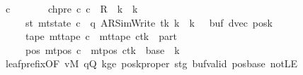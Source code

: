 \begin{isabellebody}
\ c{}\ \isanewline
\ \ \ \ \ \ ch{\isacharunderscore}{\kern0pt}pre{\isacharcolon}{\kern0pt}\ {\isachardoublequoteopen}{\isacharparenleft}{\kern0pt}c{\isacharprime}{\kern0pt}{\isacharcomma}{\kern0pt}\ c{}{\isacharparenright}{\kern0pt}\ {\isasymin}\ {\isacharquery}{\kern0pt}R\ {\isacharcircum}{\kern0pt}{\isacharcircum}{\kern0pt}\ {\isacharparenleft}{\kern0pt}{\isacharquery}{\kern0pt}k\ {\isacharplus}{\kern0pt}\ {\isacharparenleft}{\kern0pt}{\isacharquery}{\kern0pt}k\ {\isacharminus}{\kern0pt}\ {}{\isacharparenright}{\kern0pt}{\isacharparenright}{\kern0pt}{\isachardoublequoteclose}\isanewline
\ \ \ \ \ st{}{\isacharcolon}{\kern0pt}\ {\isachardoublequoteopen}mt{\isacharunderscore}{\kern0pt}state\ c{}\ {\isacharequal}{\kern0pt}\ {\isacharparenleft}{\kern0pt}q{\isacharcomma}{\kern0pt}\ AR{\isacharunderscore}{\kern0pt}SimWrite{\isacharcomma}{\kern0pt}\ tk{\isacharcomma}{\kern0pt}\ {\isacharquery}{\kern0pt}k\ {\isacharplus}{\kern0pt}\ {\isacharparenleft}{\kern0pt}{\isacharquery}{\kern0pt}k\ {\isacharminus}{\kern0pt}\ {}{\isacharparenright}{\kern0pt}{\isacharcomma}{\kern0pt}\ buf{\isacharcomma}{\kern0pt}\ dvec{\isacharcomma}{\kern0pt}\ posk{\isacharparenright}{\kern0pt}{\isachardoublequoteclose}\isanewline
\ \ \ \ \ tape{}{\isacharcolon}{\kern0pt}\ {\isachardoublequoteopen}mt{\isacharunderscore}{\kern0pt}tape\ c{}\ {\isacharequal}{\kern0pt}\ {\isacharparenleft}{\kern0pt}mt{\isacharunderscore}{\kern0pt}tape\ c{\isacharprime}{\kern0pt}{\isacharparenright}{\kern0pt}{\isacharparenleft}{\kern0pt}tk\ {\isacharcolon}{\kern0pt}{\isacharequal}{\kern0pt}\ {\isacharquery}{\kern0pt}part{\isacharparenright}{\kern0pt}{\isachardoublequoteclose}\isanewline
\ \ \ \ \ pos{}{\isacharcolon}{\kern0pt}\ {\isachardoublequoteopen}mt{\isacharunderscore}{\kern0pt}pos\ c{}\ {\isacharequal}{\kern0pt}\ {\isacharparenleft}{\kern0pt}mt{\isacharunderscore}{\kern0pt}pos\ c{\isacharprime}{\kern0pt}{\isacharparenright}{\kern0pt}{\isacharparenleft}{\kern0pt}tk\ {\isacharcolon}{\kern0pt}{\isacharequal}{\kern0pt}\ base\ {\isacharplus}{\kern0pt}\ {\isacharparenleft}{\kern0pt}{\isacharquery}{\kern0pt}k\ {\isacharminus}{\kern0pt}\ {}{\isacharparenright}{\kern0pt}{\isacharparenright}{\kern0pt}{\isachardoublequoteclose}\isanewline
\ \ \ \ \isamarkupfalse%
\ leaf{\isacharunderscore}{\kern0pt}prefix{\isacharbrackleft}{\kern0pt}OF\ vM\ qQ\ kge{}\ poskproper\ stg\ buf{\isacharunderscore}{\kern0pt}valid\ pos{\isacharunderscore}{\kern0pt}base\ notLE\isanewline

\end{isabellebody}
